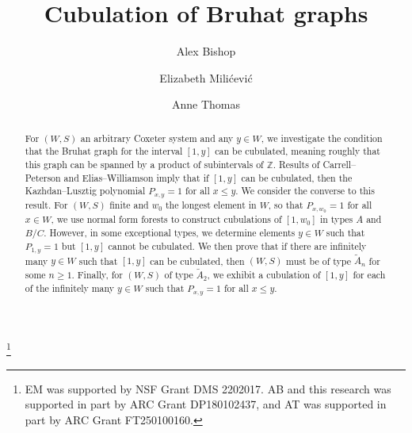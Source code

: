 \documentclass[11pt]{amsart}
\theoremstyle{plain}
\theoremstyle{definition}
\newcommand{\Z}{\mathbb{Z}}
\newcommand{\Pxy}{P_{x,y}} %
\numberwithin{equation}{subsection}
\begin{document}

\title[Cubulation of Bruhat graphs]{Cubulation of Bruhat graphs}

\author{Alex Bishop}
\address{School of Mathematical and Physical Sciences, University of Technology Sydney, Building 4 (CB04), 745 Harris Street, Broadway NSW 2007, Australia}


\author{Elizabeth Mili\'{c}evi\'{c}}
\address{Elizabeth Mili\'{c}evi\'{c}, Department of Mathematics \& Statistics, Haverford College, 370 Lancaster Avenue, Haverford, PA, USA}

\author{Anne Thomas}
\address{Anne Thomas, School of Mathematics \& Statistics, Carslaw Building F07,  University of Sydney NSW 2006, Australia}



\thanks{EM was supported by NSF Grant DMS 2202017. AB and this research was supported in part by ARC Grant DP180102437, and AT was supported in part by ARC Grant FT250100160.}



\begin{abstract}
  For $(W,S)$ an arbitrary Coxeter system and any $y \in W$, we investigate the condition that the Bruhat graph for the interval $[1,y]$ can be cubulated, meaning roughly that this graph can be spanned by a product of subintervals of $\Z$. Results of Carrell--Peterson and Elias--Williamson imply that if $[1,y]$ can be cubulated, then the Kazhdan--Lusztig polynomial $\Pxy = 1$ for all $x \leq y$. We consider the converse to this result. For $(W,S)$ finite and $w_0$ the longest element in $W$, so that $P_{x,w_0} = 1$ for all $x \in W$, we use normal form forests to construct cubulations of $[1,w_0]$ in types $A$ and $B/C$. However, in some exceptional types, we determine elements $y \in W$ such that $P_{1,y} = 1$ but $[1,y]$ cannot be cubulated.  We then prove that if there are infinitely many $y \in W$ such that $[1,y]$ can be cubulated, then $(W,S)$ must be of type $\tilde{A}_n$ for some $n \geq 1$. Finally, for $(W,S)$ of type $\tilde{A}_2$, we exhibit a cubulation of $[1,y]$ for each of the infinitely many $y \in W$ such that $\Pxy = 1$ for all $x \leq y$.
\end{abstract}


\maketitle
\end{document}
